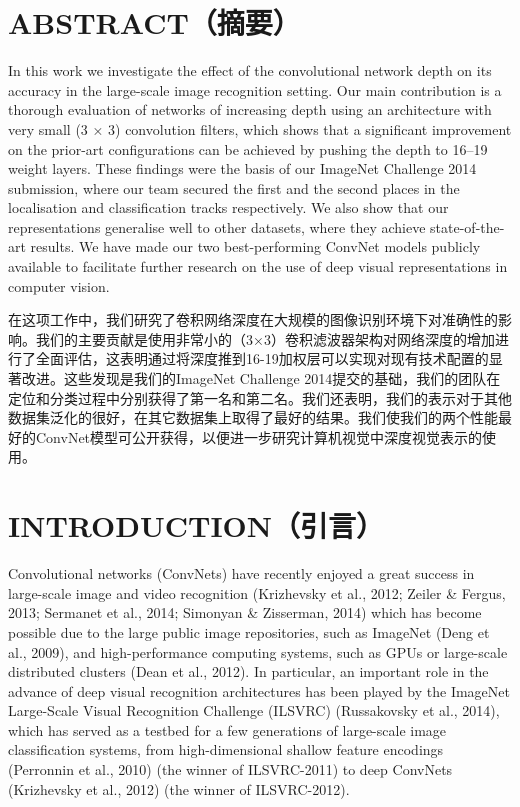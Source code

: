 \documentclass[12pt,a4paper,UTF8,twoside]{book}
\begin{document}
\hypertarget{abstractux6458ux8981-1}{%
\section{ABSTRACT（摘要）}\label{abstractux6458ux8981-1}}

In this work we investigate the effect of the convolutional network depth on its accuracy in the large-scale image recognition setting. Our main contribution is a thorough evaluation of networks of increasing depth using an architecture with very small (3 × 3) convolution filters, which shows that a significant improvement on the prior-art configurations can be achieved by pushing the depth to 16--19 weight layers. These findings were the basis of our ImageNet Challenge 2014 submission, where our team secured the first and the second places in the localisation and classification tracks respectively. We also show that our representations generalise well to other datasets, where they achieve state-of-the-art results. We have made our two best-performing ConvNet models publicly available to facilitate further research on the use of deep visual representations in computer vision.

在这项工作中，我们研究了卷积网络深度在大规模的图像识别环境下对准确性的影响。我们的主要贡献是使用非常小的（3×3）卷积滤波器架构对网络深度的增加进行了全面评估，这表明通过将深度推到16-19加权层可以实现对现有技术配置的显著改进。这些发现是我们的ImageNet Challenge 2014提交的基础，我们的团队在定位和分类过程中分别获得了第一名和第二名。我们还表明，我们的表示对于其他数据集泛化的很好，在其它数据集上取得了最好的结果。我们使我们的两个性能最好的ConvNet模型可公开获得，以便进一步研究计算机视觉中深度视觉表示的使用。

\hypertarget{introductionux5f15ux8a00-1}{%
\section{INTRODUCTION（引言）}\label{introductionux5f15ux8a00-1}}

Convolutional networks (ConvNets) have recently enjoyed a great success in large-scale image and video recognition (Krizhevsky et al., 2012; Zeiler \& Fergus, 2013; Sermanet et al., 2014; Simonyan \& Zisserman, 2014) which has become possible due to the large public image repositories, such as ImageNet (Deng et al., 2009), and high-performance computing systems, such as GPUs or large-scale distributed clusters (Dean et al., 2012). In particular, an important role in the advance of deep visual recognition architectures has been played by the ImageNet Large-Scale Visual Recognition Challenge (ILSVRC) (Russakovsky et al., 2014), which has served as a testbed for a few generations of large-scale image classification systems, from high-dimensional shallow feature encodings (Perronnin et al., 2010) (the winner of ILSVRC-2011) to deep ConvNets (Krizhevsky et al., 2012) (the winner of ILSVRC-2012).
\end{document}
